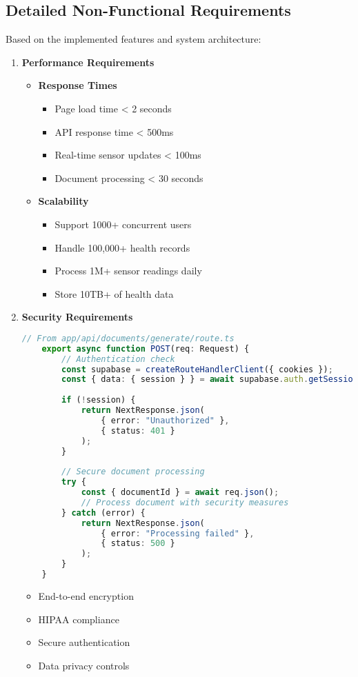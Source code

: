 \subsection{Detailed Non-Functional Requirements}
Based on the implemented features and system architecture:

\begin{enumerate}
    \item \textbf{Performance Requirements}
    \begin{itemize}
        \item \textbf{Response Times}
        \begin{itemize}
            \item Page load time < 2 seconds
            \item API response time < 500ms
            \item Real-time sensor updates < 100ms
            \item Document processing < 30 seconds
        \end{itemize}

        \item \textbf{Scalability}
        \begin{itemize}
            \item Support 1000+ concurrent users
            \item Handle 100,000+ health records
            \item Process 1M+ sensor readings daily
            \item Store 10TB+ of health data
        \end{itemize}
    \end{itemize}

    \item \textbf{Security Requirements}
    \begin{lstlisting}[language=typescript]
    // From app/api/documents/generate/route.ts
    export async function POST(req: Request) {
        // Authentication check
        const supabase = createRouteHandlerClient({ cookies });
        const { data: { session } } = await supabase.auth.getSession();
        
        if (!session) {
            return NextResponse.json(
                { error: "Unauthorized" },
                { status: 401 }
            );
        }
        
        // Secure document processing
        try {
            const { documentId } = await req.json();
            // Process document with security measures
        } catch (error) {
            return NextResponse.json(
                { error: "Processing failed" },
                { status: 500 }
            );
        }
    }
    \end{lstlisting}
    \begin{itemize}
        \item End-to-end encryption
        \item HIPAA compliance
        \item Secure authentication
        \item Data privacy controls
    \end{itemize}


\end{enumerate}
